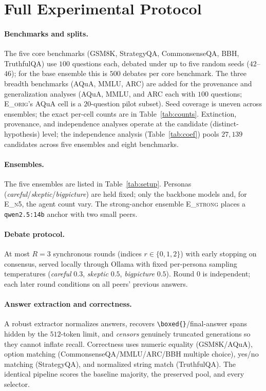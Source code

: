 \section{Full Experimental Protocol}
\label{app:protocol}

\paragraph{Benchmarks and splits.}
The five core benchmarks (GSM8K, StrategyQA, CommonsenseQA, BBH, TruthfulQA) use $100$ questions each,
debated under up to five random seeds ($42$--$46$); for the base ensemble this is $500$ debates per core
benchmark. The three breadth benchmarks (AQuA, MMLU, ARC) are added for the provenance and generalization
analyses (AQuA, MMLU, and ARC each with $100$ questions; \textsc{E\_orig}'s AQuA cell is a $20$-question pilot
subset). Seed coverage is uneven across
ensembles; the exact per-cell counts are in Table~\ref{tab:counts}. Extinction, provenance, and independence analyses operate at
the candidate (distinct-hypothesis) level; the independence analysis (Table~\ref{tab:coef}) pools
$27{,}139$ candidates across five ensembles and eight benchmarks.

\paragraph{Ensembles.}
The five ensembles are listed in Table~\ref{tab:setup}. Personas
(\emph{careful}/\emph{skeptic}/\emph{bigpicture}) are held fixed; only the backbone models and, for
\textsc{E\_n5}, the agent count vary. The strong-anchor ensemble \textsc{E\_strong} places a
\texttt{qwen2.5:14b} anchor with two small peers.

\paragraph{Debate protocol.}
At most $R=3$ synchronous rounds (indices $r\in\{0,1,2\}$) with early stopping on consensus, served locally through Ollama with fixed
per-persona sampling temperatures (\emph{careful} $0.3$, \emph{skeptic} $0.5$, \emph{bigpicture} $0.5$).
Round $0$ is independent; each later round conditions on all peers' previous answers.

\paragraph{Answer extraction and correctness.}
A robust extractor normalizes answers, recovers \texttt{\textbackslash boxed\{\}}/final-answer spans hidden
by the $512$-token limit, and \emph{censors} genuinely truncated generations so they cannot inflate recall.
Correctness uses numeric equality (GSM8K/AQuA), option matching (CommonsenseQA/MMLU/ARC/BBH multiple
choice), yes/no matching (StrategyQA), and normalized string match (TruthfulQA). The identical pipeline
scores the baseline majority, the preserved pool, and every selector.

